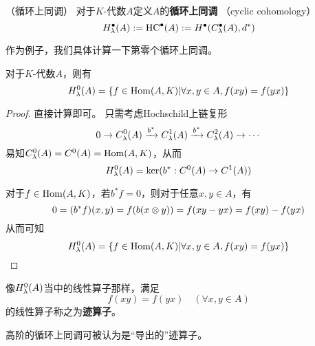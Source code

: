 
\begin{definition}（循环上同调）
对于$K$-代数$A$定义$A$的\textbf{循环上同调}
（cyclic cohomology）
$$H^{\bullet}_{\lambda}(A):=\operatorname{HC}^{\bullet}(A)
:=H^{\bullet}(C_{\lambda}^{\bullet}(A),d^*)$$
\end{definition}

作为例子，我们具体计算一下第零个循环上同调。

\begin{example}对于$K$-代数$A$，则有
$$H^0_{\lambda}(A)=\{f\in\operatorname{Hom}(A,K)|
\forall x,y\in A,f(xy)=f(yx)\}$$
\end{example}

\begin{proof}直接计算即可。
只需考虑Hochschild上链复形
$$0\to C^0_\lambda(A)\xrightarrow{b^*}C^1_{\lambda}(A)
\xrightarrow{b^*}C^2_{\lambda}(A)\to\cdots$$
易知$C^0_{\lambda}(A)=C^0(A)=\operatorname{Hom}(A,K)$，从而
$$H^0_{\lambda}(A)=\ker(b^*:C^0(A)\to C^1(A))$$

对于$f\in\operatorname{Hom}(A,K)$，若$b^*f=0$，则对于任意$x,y\in A$，有
$$0=(b^*f)(x,y)=f(b(x\otimes y))=f(xy-yx)=f(xy)-f(yx)$$
从而可知
$$H^0_{\lambda}(A)=\{f\in\operatorname{Hom}(A,K)|
\forall x,y\in A,f(xy)=f(yx)\}$$
\end{proof}

像$H^0_{\lambda}(A)$当中的线性算子那样，满足
$$f(xy)=f(yx)\quad(\forall x,y\in A)$$
的线性算子称之为\textbf{迹算子}。

高阶的循环上同调可被认为是“导出的”迹算子。









